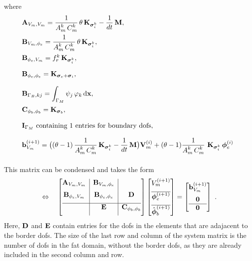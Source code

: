 where
\begin{equation*}
  \begin{array}{lll}
    \bfA_{V_m,V_m} = \dfrac{1}{A_m^k\,C_m^k}\theta\,\bfK_{\bfsigma_i^k} -\dfrac{1}{dt}\bfM,\\[4mm]
    \bfB_{V_m,\phi_e} = \dfrac{1}{A_m^k\,C_m^k}\theta\,\bfK_{\bfsigma_i^k},\\[4mm]
    \bfB_{\phi_e,V_m} = f_r^k \,\bfK_{\bfsigma_i^k},\\[4mm]
    \bfB_{\phi_e,\phi_e} = \bfK_{\bfsigma_e + \bfsigma_i},\\[4mm]
    \bfB_{\Gamma_B,kj} = \ds\int_{\Gamma_M} \psi_j\,\varphi_k \,\d\bfx,\\[4mm]
    \bfC_{\phi_b,\phi_b} = \bfK_{\bfsigma_b},\\[4mm]
    \bfI_{\Gamma_M} \text{ containing 1 entries for boundary dofs},\\[4mm]
    \bfb_{V_m}^{(i+1)} = \big((\theta-1)\, \dfrac{1}{A_m^k\,C_m^k}\bfK_{\bfsigma_i^k} - \dfrac{1}{dt}\bfM\big) \bfV_m^{(i)} 
      + (\theta - 1)\dfrac{1}{A_m^k\,C_m^k}\,\bfK_{\bfsigma_i^k}\,\bfphi_e^{(i)}\\[4mm]
  \end{array}
\end{equation*}

This matrix can be condensed and takes the form
\begin{equation*}
  \begin{array}{lll}
    \Leftrightarrow
    \quad 
    \left[\begin{array}{@{}c|c|c@{}}
      \bfA_{V_m,V_m} & \bfB_{V_m,\phi_e} & \\[2mm]
      \bfB_{\phi_e,V_m} & \bfB_{\phi_e,\phi_e} & \bfD \\[2mm] \hline
      &\bfE &\bfC_{\phi_b,\phi_b}\\[2mm]
    \end{array}\right]
    \left[\begin{array}{@{}c@{}}
      V_{m}^{(i+1)}  \\[2mm]\hline 
      \bfphi_{e}^{(i+1)} \\[2mm]\hline
      \hat{\bfphi}_{b}^{(i+1)}
    \end{array}\right]
    = 
    \left[\begin{array}{@{}c@{}}
      \bfb_{V_m}^{(i+1)} \\[2mm]
      \bfzero\\\hline
      \bfzero
    \end{array}\right]
  \end{array}.
\end{equation*}
Here, $\textbf{D}$ and $\textbf{E}$ contain entries for the dofs in the elements that are adajacent to the border dofs. The size of the last row and column of the system matrix is the number of dofs in the fat domain, without the border dofs, as they are already included in the second column and row.

